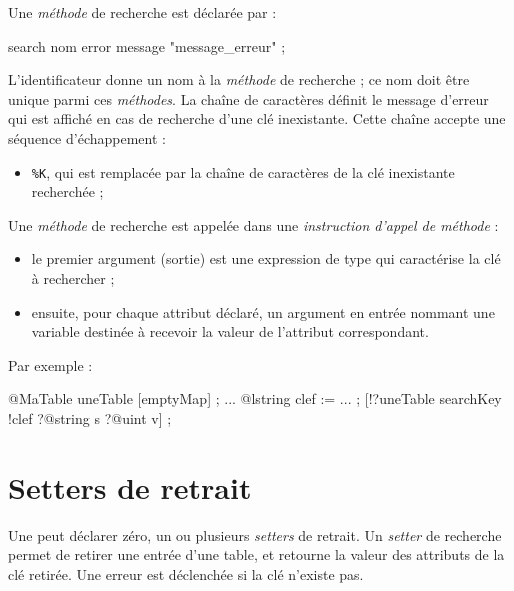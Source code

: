 Une \emph{méthode} de recherche est déclarée par :

\begin{galgascode}
search nom error message "message_erreur" ;
\end{galgascode}

L'identificateur  donne un nom à la \emph{méthode} de recherche ; ce nom doit être unique parmi ces \emph{méthodes}. La chaîne de caractères  définit le message d'erreur qui est affiché en cas de recherche d'une clé inexistante. Cette chaîne accepte une séquence d'échappement :
\begin{itemize}
  \item \colorbox{\couleurCodeGALGAS}{\texttt{\%K}}, qui est remplacée par la chaîne de caractères de la clé inexistante recherchée ;
\end{itemize}


Une \emph{méthode} de recherche est appelée dans une \emph{instruction d'appel de méthode} :
\begin{itemize}
  \item le premier argument (sortie) est une expression de type  qui caractérise la clé à rechercher ;
  \item ensuite, pour chaque attribut déclaré, un argument en entrée nommant une variable destinée à recevoir la valeur de l'attribut correspondant.
\end{itemize}

Par exemple :
\begin{galgascode}
@MaTable uneTable [emptyMap] ;
...
@lstring clef := ... ;
[!?uneTable searchKey !clef ?@string s ?@uint v] ;
\end{galgascode}













\section{Setters de retrait}

Une  peut déclarer zéro, un ou plusieurs \emph{setters} de retrait. Un \emph{setter} de recherche permet de retirer une entrée d'une table, et retourne la valeur des attributs de la clé retirée. Une erreur est déclenchée si la clé n'existe pas.


